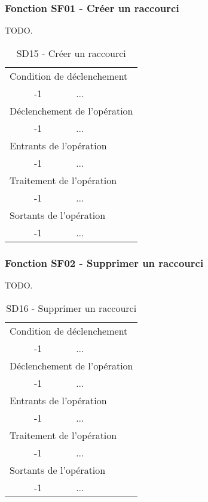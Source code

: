 \documentclass[a4paper]{article}
\begin{document}
\subsubsection{Fonction SF01 - Créer un raccourci}
TODO.\\
\begin{table}[H]
  \centering
   \small
	\begin{tabular}{|c|p{12cm}|}
   		\hline
   			\rowcolor{lightgray}\multicolumn{2}{|c|}{\textbf{SD15 - Créer un raccourci}} \\
   		\hline
   			\multicolumn{2}{|l|}{Condition de d\'eclenchement} \\
   		\hline
   			-1 & ...\\
   		\hline
   			\multicolumn{2}{|l|}{D\'eclenchement de l'op\'eration} \\
   		\hline
   			-1 & ...\\
   		\hline
   			\multicolumn{2}{|l|}{Entrants de l'op\'eration} \\
   		\hline
   			-1 & ...\\
   		\hline
   			\multicolumn{2}{|l|}{Traitement de l'op\'eration} \\
  		\hline
   			-1 & ...\\
   		\hline
   			\multicolumn{2}{|l|}{Sortants de l'op\'eration} \\
   		\hline
   			-1 & ...\\
   		\hline
	\end{tabular}
  \caption{SD15 - Créer un raccourci}
  \normalsize
  \label{tab:creer_raccourci}
\end{table}


\subsubsection{Fonction SF02 - Supprimer un raccourci}
TODO.\\
\begin{table}[H]
  \centering
   \small
	\begin{tabular}{|c|p{12cm}|}
   		\hline
   			\rowcolor{lightgray}\multicolumn{2}{|c|}{\textbf{SD16 - Supprimer un raccourci}} \\
   		\hline
   			\multicolumn{2}{|l|}{Condition de d\'eclenchement} \\
   		\hline
   			-1 & ...\\
   		\hline
   			\multicolumn{2}{|l|}{D\'eclenchement de l'op\'eration} \\
   		\hline
   			-1 & ...\\
   		\hline
   			\multicolumn{2}{|l|}{Entrants de l'op\'eration} \\
   		\hline
   			-1 & ...\\
   		\hline
   			\multicolumn{2}{|l|}{Traitement de l'op\'eration} \\
  		\hline
   			-1 & ...\\
   		\hline
   			\multicolumn{2}{|l|}{Sortants de l'op\'eration} \\
   		\hline
   			-1 & ...\\
   		\hline
	\end{tabular}
  \caption{SD16 - Supprimer un raccourci}
  \normalsize
  \label{tab:supprimer_raccourci}
\end{table}
\end{document}
